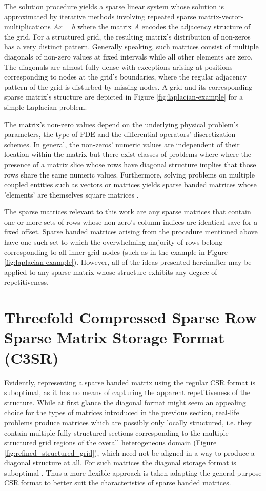 \documentclass{article}
\begin{document}
    The solution procedure yields a sparse linear system whose solution is approximated by iterative methods involving repeated sparse matrix-vector-multiplications $Ax = b$ where the matrix $A$ encodes the adjacency structure of the grid. For a structured grid, the resulting matrix's distribution of non-zeros has a very distinct pattern. Generally speaking, such matrices consist of multiple diagonals of non-zero values at fixed intervals while all other elements are zero. The diagonals are almost fully dense with exceptions arising at positions corresponding to nodes at the grid's boundaries, where the regular adjacency pattern of the grid is disturbed by missing nodes. A grid and its corresponding sparse matrix's structure are depicted in Figure \ref{fig:laplacian-example} for a simple Laplacian problem.

    The matrix's non-zero values depend on the underlying physical problem's parameters, the type of PDE and the differential operators' discretization schemes. In general, the non-zeros' numeric values are independent of their location within the matrix but there exist classes of problems where where the presence of a matrix slice whose rows have diagonal structure implies that those rows share the same numeric values. Furthermore, solving problems on multiple coupled entities such as vectors or matrices yields sparse banded matrices whose 'elements' are themselves square matrices \cite{Godwin2013}.

    The sparse matrices relevant to this work are any sparse matrices that contain one or more sets of rows whose non-zero's column indices are identical save for a fixed offset. Sparse banded matrices arising from the procedure mentioned above have one such set to which the overwhelming majority of rows belong corresponding to all inner grid nodes (such as in the example in Figure \ref{fig:laplacian-example}). However, all of the ideas presented hereinafter may be applied to any sparse matrix whose structure exhibits any degree of repetitiveness.

\section{Threefold Compressed Sparse Row Sparse Matrix Storage Format (C3SR)}

  Evidently, representing a sparse banded matrix using the regular CSR format is suboptimal, as it has no means of capturing the apparent repetitiveness of the structure. While at first glance the diagonal format might seem an appealing choice for the types of matrices introduced in the previous section, real-life problems produce matrices which are possibly only locally structured, i.e. they contain multiple fully structured sections corresponding to the multiple structured grid regions of the overall heterogeneous domain (Figure \ref{fig:refined_structured_grid}), which need not be aligned in a way to produce a diagonal structure at all. For such matrices the diagonal storage format is suboptimal \cite{Bell2011}. Thus a more flexible approach is taken adapting the general purpose CSR format to better suit the characteristics of sparse banded matrices.
\end{document}
